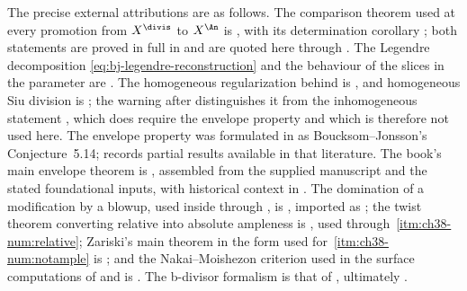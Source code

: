 The precise external attributions are as follows.  The comparison theorem
used at every promotion from $X^{\divis}$ to $X^{\An}$ is
\cite[Theorem~4.22]{BJ22}, with its determination corollary
\cite[Corollary~4.23]{BJ22}; both statements are proved in full in
 and are quoted here through
.  The Legendre decomposition
\eqref{eq:bj-legendre-reconstruction} and the behaviour of the slices in the
parameter are \cite[Lemma~6.23 and Theorem~6.24]{BJ22}.  The homogeneous
regularization behind  is
\cite[Corollary~6.17]{BJ22}, and homogeneous Siu division is
\cite[Theorem~6.21]{BJ22}; the warning after
 distinguishes it from the
inhomogeneous statement \cite[Theorem~6.31]{BJ22}, which does require the
envelope property and which is therefore not used here.  The envelope
property was formulated in \cite{BJ22} as Boucksom--Jonsson's
Conjecture~5.14; \cite{BJ22b} records partial results available in that
literature.  The book's main envelope theorem is ,
assembled from the supplied manuscript and the stated foundational inputs,
with historical context in
.  The domination of a modification by a blowup, used inside
 through , is
\cite[\href{https://stacks.math.columbia.edu/tag/081T}{Tag 081T}]{stacks-project},
imported as ; the twist theorem
converting relative into absolute ampleness is \cite[4.6.13]{EGAII}, used
through \,\cref{itm:ch38-num:relative};
Zariski's main theorem in the form used for
\,\cref{itm:ch38-num:notample} is
\cite[Corollary~III.11.4]{Har}; and the Nakai--Moishezon criterion used in
the surface computations of  and
 is \cite[Theorem~1.2.23]{PAG1}.  The b-divisor
formalism is that of , ultimately
\cite{BFJ09}.

